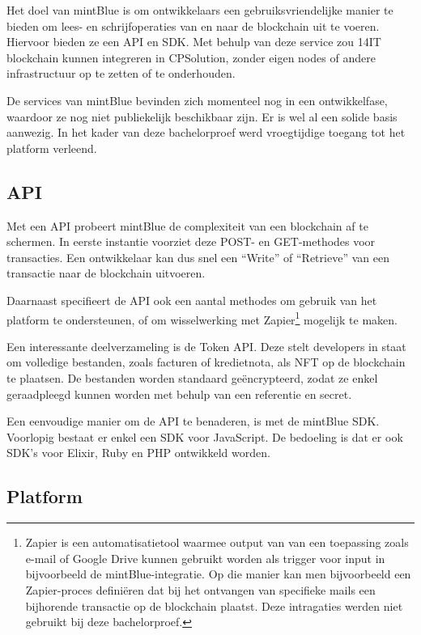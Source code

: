 Het doel van mintBlue is om ontwikkelaars een gebruiksvriendelijke manier te bieden om lees- en schrijfoperaties van en naar de blockchain uit te voeren. Hiervoor bieden ze een API en SDK. Met behulp van deze service zou 14IT blockchain kunnen integreren in CPSolution, zonder eigen nodes of andere infrastructuur op te zetten of te onderhouden.

De services van mintBlue bevinden zich momenteel nog in een ontwikkelfase, waardoor ze nog niet publiekelijk beschikbaar zijn. Er is wel al een solide basis aanwezig. In het kader van deze bachelorproef werd vroegtijdige toegang tot het platform verleend.

\subsection{API}
\label{sub:api}

Met een API probeert mintBlue de complexiteit van een blockchain af te schermen. In eerste instantie voorziet deze POST- en GET-methodes voor transacties. Een ontwikkelaar kan dus snel een ``Write'' of ``Retrieve'' van een transactie naar de blockchain uitvoeren.

Daarnaast specifieert de API ook een aantal methodes om gebruik van het platform te ondersteunen, of om wisselwerking met Zapier\footnote{Zapier is een automatisatietool waarmee output van van een toepassing zoals e-mail of Google Drive kunnen gebruikt worden als trigger voor input in bijvoorbeeld de mintBlue-integratie. Op die manier kan men bijvoorbeeld een Zapier-proces definiëren dat bij het ontvangen van specifieke mails een bijhorende transactie op de blockchain plaatst. Deze intragaties werden niet gebruikt bij deze bachelorproef.} mogelijk te maken.

Een interessante deelverzameling is de Token API. Deze stelt developers in staat om volledige bestanden, zoals facturen of kredietnota, als NFT op de blockchain te plaatsen. De bestanden worden standaard geëncrypteerd, zodat ze enkel geraadpleegd kunnen worden met behulp van een referentie en secret.

Een eenvoudige manier om de API te benaderen, is met de mintBlue SDK. Voorlopig bestaat er enkel een SDK voor JavaScript. De bedoeling is dat er ook SDK's voor Elixir, Ruby en PHP ontwikkeld worden.

\subsection{Platform}
\label{sub:platform}

